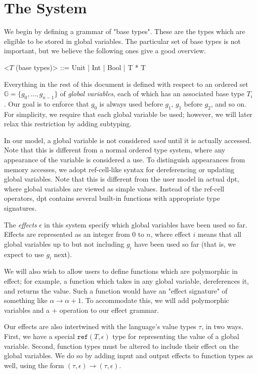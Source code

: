 \documentclass{article}
\begin{document}
\section*{The System}
We begin by defining a grammar of "base types". These are the types which are eligible to be stored in global variables. The particular set of base types is not important, but we believe the following ones give a good overview.

\begin{grammar}
	<$T$ (base types)> ::= Unit | Int | Bool | T * T
\end{grammar}

Everything in the rest of this document is defined with respect to an ordered set $\mathbb{G} = \{g_0, \dots, g_{n-1}\}$ of \emph{global variables}, each of which has an associated base type $T_i$. Our goal is to enforce that $g_0$ is always used before $g_1$, $g_1$ before $g_2$, and so on. For simplicity, we require that each global variable be used; however, we will later relax this restriction by adding subtyping.

In our model, a global variable is not considered \emph{used} until it is actually accessed. Note that this is different from a normal ordered type system, where any appearance of the variable is considered a use. To distinguish appearances from memory accesses, we adopt ref-cell-like syntax for dereferencing or updating global variables. Note that this is different from the user model in actual dpt, where global variables are viewed as simple values. Instead of the ref-cell operators, dpt contains several built-in functions with appropriate type signatures.

The \emph{effects} $\epsilon$ in this system specify which global variables have been used so far. Effects are represented as an integer from $0$ to $n$, where effect $i$ means that all global variables up to but not including $g_i$ have been used so far (that is, we expect to use $g_i$ next).

We will also wish to allow users to define functions which are polymorphic in effect; for example, a function which takes in any global variable, dereferences it, and returns the value. Such a function would have an "effect signature" of something like $\alpha \rightarrow \alpha + 1$. To accommodate this, we will add polymorphic variables and a $+$ operation to our effect grammar.

Our effects are also intertwined with the language's value types $\tau$, in two ways. First, we have a special $\texttt{ref} (T, \epsilon)$ type for representing the value of a global variable. Second, function types must be altered to include their effect on the global variables. We do so by adding input and output effects to function types as well, using the form $(\tau, \epsilon) \rightarrow (\tau, \epsilon)$.
\end{document}
